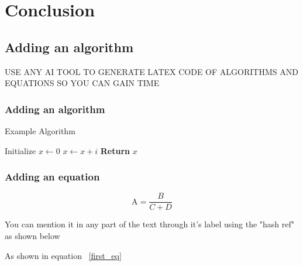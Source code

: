 \chapter{Conclusion}
\section{Adding an algorithm}

 USE ANY AI TOOL TO GENERATE LATEX CODE OF ALGORITHMS AND EQUATIONS SO YOU CAN GAIN TIME 

\subsection{Adding an algorithm}

\begin{algorithm}
\caption{Example Algorithm}
\begin{algorithmic}[1]  %
\State Initialize $x \gets 0$
    \State $x \gets x + i$
\EndFor
\State \textbf{Return} $x$
\end{algorithmic}
\end{algorithm}

\subsection{Adding an equation}
        \begin{equation}
        \text{A} = \frac{B}{C + D} 
        \label{first_eq}
        \end{equation}
        
You can mention it in any part of the text through it's label using the "hash ref" as shown below 

As shown in equation ~\ref{first_eq} %